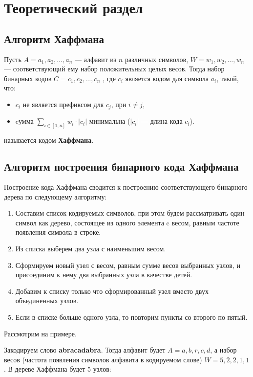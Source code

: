 \chapter{Теоретический раздел}

\section{Алгоритм Хаффмана}

Пусть $A={a_1,a_2,…,a_n}$ — алфавит из $n$ различных символов, $W={w_1,w_2,…,w_n}$ — соответствующий ему набор положительных целых весов. Тогда набор бинарных кодов $C={c_1,c_2,…,c_n}$ , где $c_i$ является кодом для символа $a_i$, такой, что:

\begin{itemize}
\item $c_i$ не является префиксом для $c_j$, при $i\neq j$,
\item cумма $\sum_{i \in [1,n]}{w_i \cdot |c_i|}$ минимальна ($|c_i|$ — длина кода $c_i$).
\end{itemize}
называется кодом \textbf{Хаффмана}.

\section{Алгоритм построения бинарного кода Хаффмана}

Построение кода Хаффмана сводится к построению соответствующего бинарного дерева по следующему алгоритму:
\begin{enumerate}
\item Составим список кодируемых символов, при этом будем рассматривать один символ как дерево, состоящее из одного элемента c весом, равным частоте появления символа в строке.
\item Из списка выберем два узла с наименьшим весом.
\item Сформируем новый узел с весом, равным сумме весов выбранных узлов, и присоединим к нему два выбранных узла в качестве детей.
\item Добавим к списку только что сформированный узел вместо двух объединенных узлов.
\item Если в списке больше одного узла, то повторим пункты со второго по пятый.
\end{enumerate}

Рассмотрим на примере.

Закодируем слово \textbf{abracadabra}. Тогда алфавит будет $A={a,b,r,c,d}$, а набор весов (частота появления символов алфавита в кодируемом слове) $W={5,2,2,1,1}$. В дереве Хаффмана будет 5 узлов:

